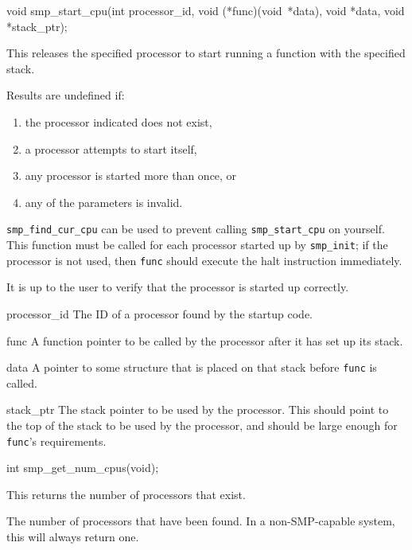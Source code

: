 \begin{apisyn}

        \funcproto void smp_start_cpu(int processor_id,
				void (*func)(void~*data),
				void *data,
				void *stack_ptr);
\end{apisyn}
\begin{apidesc}
	This releases the specified processor to start running
	a function with the specified stack.

	Results are undefined if:
	\begin{enumerate}
	\item the processor indicated does not exist,
	\item a processor attempts to start itself,
	\item any processor is started more than once, or
	\item any of the parameters is invalid.
	\end{enumerate}

	{\tt smp_find_cur_cpu} can be 
	used to prevent calling {\tt smp_start_cpu} on yourself.
	This function must be called for each processor started
	up by {\tt smp_init}; if the processor is not used,
	then {\tt func} should execute the halt instruction
	immediately.

	It is up to the user to verify that the processor is
	started up correctly.
\end{apidesc}
\begin{apiparm}
	\item[processor_id]
		The ID of a processor found by the startup code.
	\item[func]
		A function pointer to be called by the processor
		after it has set up its stack.
	\item[data]
		A pointer to some structure that is placed on
		that stack before {\tt func} is called.
	\item[stack_ptr]
		The stack pointer to be used by the processor.
		This should point to the top of the stack to be
		used by the processor, and should be large enough
		for {\tt func}'s requirements.
\end{apiparm}



\begin{apisyn}

        \funcproto int smp_get_num_cpus(void);
\end{apisyn}
\begin{apidesc}
	This returns the number of processors that exist.
\end{apidesc}
\begin{apiret}
	The number of processors that have been found.
	In a non-SMP-capable system, this will always return one.
\end{apiret}


